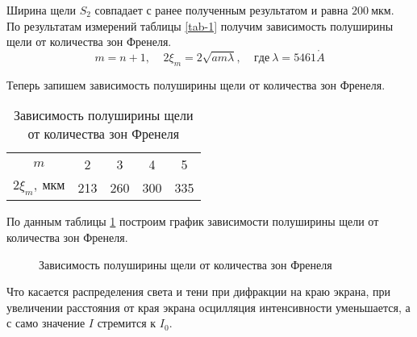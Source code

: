 \documentclass{lab}
\renewcommand{\AA}{\ensuremath{\mathring{A}}}
\begin{document}
Ширина щели $ S_2 $ совпадает с ранее полученным результатом и равна $ 200~мкм $.\\

По результатам измерений таблицы \ref{tab-1} получим зависимость полуширины щели от количества зон Френеля.
\begin{equation}
m = n + 1, ~~~~~ 2\xi_m = 2\sqrt{am\lambda}, ~~~~~ где ~ \lambda = 5461 \AA
\end{equation}

\newpage

Теперь запишем зависимость полуширины щели от количества зон Френеля.
\begin{table}[H]
	\centering
	\begin{tabular}{|c|cccc|}
		\hline
		$ m $ & 2 & 3 & 4 & 5 \\
		$ 2\xi_m,~мкм $ & 213 & 260 & 300 & 335 \\ \hline
	\end{tabular}
	\caption{Зависимость полуширины щели от количества зон Френеля}
	\label{tab-2}
\end{table}

По данным таблицы \ref{tab-2} построим график зависимости полуширины щели от количества зон Френеля.
\begin{figure}[H]
	\centering
	\caption{Зависимость полуширины щели от количества зон Френеля}
	\label{g_1}
\end{figure}

Что касается распределения света и тени при дифракции на краю экрана, при увеличении расстояния от края экрана осцилляция интенсивности уменьшается, а с само значение $ I $ стремится к $ I_0 $.
\end{document}
